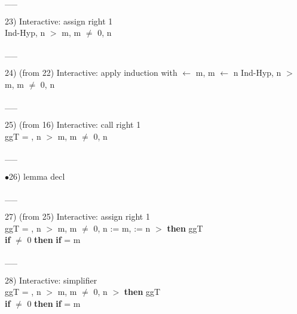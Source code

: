 \documentclass[a4paper]{article}
\begin{document}
\vspace{-1.5ex}\_\hrulefill \_

23) Interactive: assign right  1\\
Ind-Hyp, n $>$ m, m $\neq$ 0, n %

\vspace{-1.5ex}\_\hrulefill \_

24)  (from 22) Interactive: apply induction  with  $\leftarrow$ m, m $\leftarrow$ n %
Ind-Hyp, n $>$ m, m $\neq$ 0, n %

\vspace{-1.5ex}\_\hrulefill \_

25)  (from 16) Interactive: call right  1\\
\Do ggT\Dc {} = , n $>$ m, m $\neq$ 0, n %

\vspace{-1.5ex}\_\hrulefill \_

$\bullet$26) lemma decl \\
 \Fol 

\vspace{-1.5ex}\_\hrulefill \_

27)  (from 25) Interactive: assign right  1\\
\tabf \Do ggT\Dc {} = , n $>$ m, m $\neq$ 0, n %
\Fol \Do {} := m,  := n\Dc
{}  $>$  {\bf then} ggT \\
 \tabf \tabudo{}\tabudc{} {\bf if}  $\neq$ 0 {\bf then} {\bf if}  %
{} = m

\vspace{-1.5ex}\_\hrulefill \_

28) Interactive: simplifier \\
\tabf \Do ggT\Dc {} = , n $>$ m, m $\neq$ 0, n %
\Fol {}  $>$  {\bf then} ggT \\
 \tabf {} {\bf if}  $\neq$ 0 {\bf then} {\bf if}  %
{} = m
\end{document}
